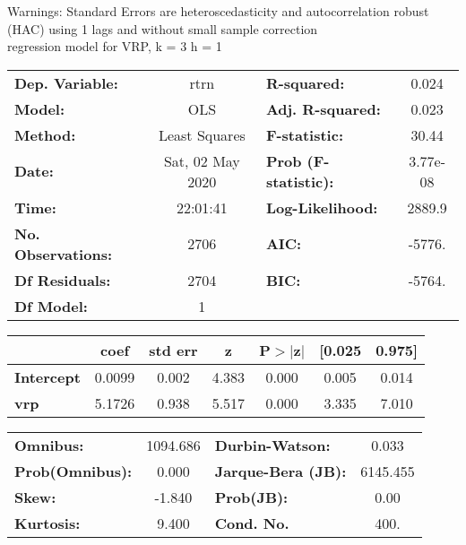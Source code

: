Warnings: \newline
 [1] Standard Errors are heteroscedasticity and autocorrelation robust (HAC) using 1 lags and without small sample correction\\ 

regression model for VRP, k = 3 h = 1\begin{center}
\begin{tabular}{lclc}
\toprule
\textbf{Dep. Variable:}    &       rtrn       & \textbf{  R-squared:         } &     0.024   \\
\textbf{Model:}            &       OLS        & \textbf{  Adj. R-squared:    } &     0.023   \\
\textbf{Method:}           &  Least Squares   & \textbf{  F-statistic:       } &     30.44   \\
\textbf{Date:}             & Sat, 02 May 2020 & \textbf{  Prob (F-statistic):} &  3.77e-08   \\
\textbf{Time:}             &     22:01:41     & \textbf{  Log-Likelihood:    } &    2889.9   \\
\textbf{No. Observations:} &        2706      & \textbf{  AIC:               } &    -5776.   \\
\textbf{Df Residuals:}     &        2704      & \textbf{  BIC:               } &    -5764.   \\
\textbf{Df Model:}         &           1      & \textbf{                     } &             \\
\bottomrule
\end{tabular}
\begin{tabular}{lcccccc}
                   & \textbf{coef} & \textbf{std err} & \textbf{z} & \textbf{P$> |$z$|$} & \textbf{[0.025} & \textbf{0.975]}  \\
\midrule
\textbf{Intercept} &       0.0099  &        0.002     &     4.383  &         0.000        &        0.005    &        0.014     \\
\textbf{vrp}       &       5.1726  &        0.938     &     5.517  &         0.000        &        3.335    &        7.010     \\
\bottomrule
\end{tabular}
\begin{tabular}{lclc}
\textbf{Omnibus:}       & 1094.686 & \textbf{  Durbin-Watson:     } &    0.033  \\
\textbf{Prob(Omnibus):} &   0.000  & \textbf{  Jarque-Bera (JB):  } & 6145.455  \\
\textbf{Skew:}          &  -1.840  & \textbf{  Prob(JB):          } &     0.00  \\
\textbf{Kurtosis:}      &   9.400  & \textbf{  Cond. No.          } &     400.  \\
\bottomrule
\end{tabular}
\end{center}


